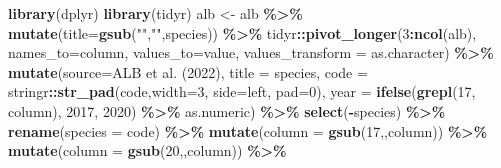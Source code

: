 \documentclass[
]{book}
\newenvironment{Shaded}{\begin{snugshade}}{\end{snugshade}}
\newcommand{\AttributeTok}[1]{\textcolor[rgb]{0.13,0.29,0.53}{#1}}
\newcommand{\DecValTok}[1]{\textcolor[rgb]{0.00,0.00,0.81}{#1}}
\newcommand{\FunctionTok}[1]{\textcolor[rgb]{0.13,0.29,0.53}{\textbf{#1}}}
\newcommand{\NormalTok}[1]{#1}
\newcommand{\OtherTok}[1]{\textcolor[rgb]{0.56,0.35,0.01}{#1}}
\newcommand{\SpecialCharTok}[1]{\textcolor[rgb]{0.81,0.36,0.00}{\textbf{#1}}}
\newcommand{\StringTok}[1]{\textcolor[rgb]{0.31,0.60,0.02}{#1}}
\begin{document}
\begin{Shaded}
\begin{Highlighting}[]
\FunctionTok{library}\NormalTok{(dplyr)}
\FunctionTok{library}\NormalTok{(tidyr)}
\NormalTok{alb }\OtherTok{\textless{}{-}}
\NormalTok{    alb }\SpecialCharTok{\%\textgreater{}\%}
    \FunctionTok{mutate}\NormalTok{(}\AttributeTok{title=}\FunctionTok{gsub}\NormalTok{(}\StringTok{"\textquotesingle{}"}\NormalTok{,}\StringTok{""}\NormalTok{,species)) }\SpecialCharTok{\%\textgreater{}\%}
\NormalTok{    tidyr}\SpecialCharTok{::}\FunctionTok{pivot\_longer}\NormalTok{(}\DecValTok{3}\SpecialCharTok{:}\FunctionTok{ncol}\NormalTok{(alb),}
                        \AttributeTok{names\_to=}\StringTok{\textquotesingle{}column\textquotesingle{}}\NormalTok{,}
                        \AttributeTok{values\_to=}\StringTok{\textquotesingle{}value\textquotesingle{}}\NormalTok{,}
                        \AttributeTok{values\_transform =}\NormalTok{ as.character) }\SpecialCharTok{\%\textgreater{}\%}
    \FunctionTok{mutate}\NormalTok{(}\AttributeTok{source=}\StringTok{\textquotesingle{}ALB et al. (2022)\textquotesingle{}}\NormalTok{,}
           \AttributeTok{title =}\NormalTok{ species,}
           \AttributeTok{code =}\NormalTok{ stringr}\SpecialCharTok{::}\FunctionTok{str\_pad}\NormalTok{(code,}\AttributeTok{width=}\DecValTok{3}\NormalTok{, }\AttributeTok{side=}\StringTok{\textquotesingle{}left\textquotesingle{}}\NormalTok{, }\AttributeTok{pad=}\StringTok{\textquotesingle{}0\textquotesingle{}}\NormalTok{),}
           \AttributeTok{year =} \FunctionTok{ifelse}\NormalTok{(}\FunctionTok{grepl}\NormalTok{(}\StringTok{\textquotesingle{}17\textquotesingle{}}\NormalTok{, column), }\DecValTok{2017}\NormalTok{, }\DecValTok{2020}\NormalTok{) }\SpecialCharTok{\%\textgreater{}\%}\NormalTok{ as.numeric) }\SpecialCharTok{\%\textgreater{}\%}
    \FunctionTok{select}\NormalTok{(}\SpecialCharTok{{-}}\NormalTok{species) }\SpecialCharTok{\%\textgreater{}\%}
    \FunctionTok{rename}\NormalTok{(}\AttributeTok{species =}\NormalTok{ code) }\SpecialCharTok{\%\textgreater{}\%}
    \FunctionTok{mutate}\NormalTok{(}\AttributeTok{column =} \FunctionTok{gsub}\NormalTok{(}\StringTok{\textquotesingle{}17\textquotesingle{}}\NormalTok{,}\StringTok{\textquotesingle{}\textquotesingle{}}\NormalTok{,column)) }\SpecialCharTok{\%\textgreater{}\%}
    \FunctionTok{mutate}\NormalTok{(}\AttributeTok{column =} \FunctionTok{gsub}\NormalTok{(}\StringTok{\textquotesingle{}20\textquotesingle{}}\NormalTok{,}\StringTok{\textquotesingle{}\textquotesingle{}}\NormalTok{,column)) }\SpecialCharTok{\%\textgreater{}\%}

\end{Highlighting}
\end{Shaded}
\end{document}
